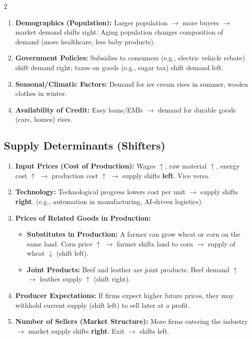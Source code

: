 \documentclass[10pt,a4paper]{article}
\begin{document}
\begin{multicols}{2}
\begin{enumerate}[leftmargin=*,nosep]
    \item \textbf{Demographics (Population):} Larger population $\to$ more buyers $\to$ market demand shifts right. Aging population changes composition of demand (more healthcare, less baby products).
    \item \textbf{Government Policies:} Subsidies to consumers (e.g., electric vehicle rebate) shift demand right; taxes on goods (e.g., sugar tax) shift demand left.
    \item \textbf{Seasonal/Climatic Factors:} Demand for ice cream rises in summer, woolen clothes in winter.
    \item \textbf{Availability of Credit:} Easy loans/EMIs $\to$ demand for durable goods (cars, homes) rises.
\end{enumerate}

\subsection*{Supply Determinants (Shifters)}
\begin{enumerate}[leftmargin=*,nosep]
    \item \textbf{Input Prices (Cost of Production):} Wages $\uparrow$, raw material $\uparrow$, energy cost $\uparrow$ $\to$ production cost $\uparrow$ $\to$ supply shifts \textbf{left}. Vice versa.
    \item \textbf{Technology:} Technological progress lowers cost per unit $\to$ supply shifts \textbf{right}. (e.g., automation in manufacturing, AI-driven logistics).
    \item \textbf{Prices of Related Goods in Production:}
    \begin{itemize}[nosep]
        \item \textbf{Substitutes in Production:} A farmer can grow wheat or corn on the same land. Corn price $\uparrow$ $\to$ farmer shifts land to corn $\to$ supply of wheat $\downarrow$ (shift left).
        \item \textbf{Joint Products:} Beef and leather are joint products. Beef demand $\uparrow$ $\to$ leather supply $\uparrow$ (shift right).
    \end{itemize}
    \item \textbf{Producer Expectations:} If firms expect higher future prices, they may withhold current supply (shift left) to sell later at a profit.
    \item \textbf{Number of Sellers (Market Structure):} More firms entering the industry $\to$ market supply shifts \textbf{right}. Exit $\to$ shifts left.

\end{enumerate}
\end{multicols}
\end{document}
